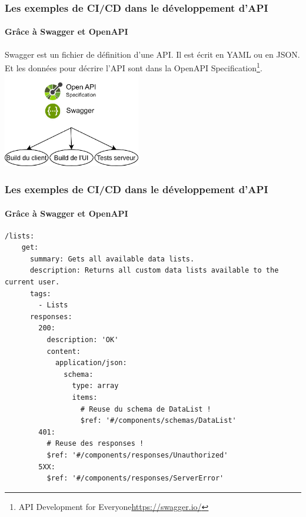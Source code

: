 \documentclass{beamer}
\begin{document}
    \begin{frame}
        \frametitle{Les exemples de CI/CD dans le développement d'API}
        \framesubtitle{Grâce à Swagger et OpenAPI}
        \transdissolve
        Swagger est un fichier de définition d'une API.
        Il est écrit en YAML ou en JSON. Et les données pour décrire l'API sont dans la OpenAPI Specification\footnote{API Development for Everyone\url{https://swagger.io/}}.
        \break
        \centering
        \includegraphics[width=6cm]{image/swagger-capacity.drawio.png}
    \end{frame}

    \begin{frame}[fragile]
        \frametitle{Les exemples de CI/CD dans le développement d'API}
        \framesubtitle{Grâce à Swagger et OpenAPI}
        \transdissolve
        \begin{lstlisting}
/lists:
    get:
      summary: Gets all available data lists.
      description: Returns all custom data lists available to the current user.
      tags:
        - Lists
      responses:
        200:
          description: 'OK'
          content:
            application/json:
              schema:
                type: array
                items:
                  # Reuse du schema de DataList !
                  $ref: '#/components/schemas/DataList'
        401:
          # Reuse des responses !
          $ref: '#/components/responses/Unauthorized'
        5XX:
          $ref: '#/components/responses/ServerError'
        \end{lstlisting}
    \end{frame}
\end{document}
